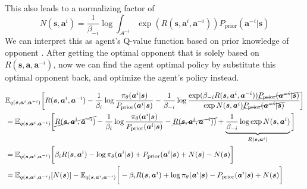 This also leads to a normalizing factor of 
\begin{equation}
    N(\boldsymbol{s}, \boldsymbol{a}^{i}) = \frac{1}{\beta_{-i} }\log \int_{\mathcal{A}^{-i}} \exp(R(\boldsymbol{s}, \boldsymbol{a}^i, \boldsymbol{a}^{-i}))P_{\text{prior}}(\boldsymbol{a}^{-i} | \boldsymbol{s})
\end{equation}
We can interpret this as agent's Q-value function based on prior knowledge of opponent \cite{grau2018balancing}. After getting the optimal opponent that is solely based on $R(\boldsymbol{s}, \boldsymbol{a}, \boldsymbol{a}^{-i})$, now we can find the agent optimal policy by substitute this optimal opponent back, and optimize the agent's policy instead.

\begin{equation*}
    \begin{aligned}
        &\mathbb{E}_{q(\boldsymbol{s}, \boldsymbol{a}^i, \boldsymbol{a}^{-i})}\bigg[ R(\boldsymbol{s}, \boldsymbol{a}^i, \boldsymbol{a}^{-i})  - \frac{1}{\beta_{i}}\log \frac{\pi_{\theta}(\boldsymbol{a}^i | \boldsymbol{s})}{P_{\text{prior}}(\boldsymbol{a}^i | \boldsymbol{s})}  - \frac{1}{\beta_{-i}}\log \frac{\exp(\beta_{-i} R(\boldsymbol{s}, \boldsymbol{a}^i, \boldsymbol{a}^{-i}))\cancel{P_{\text{prior}}(\boldsymbol{a}^{-i} | \boldsymbol{s})}}{\exp  N(\boldsymbol{s}, \boldsymbol{a}^{i}) \cancel{P_{\text{prior}}(\boldsymbol{a}^{-i} | \boldsymbol{s})} } \bigg] \\
        &= \mathbb{E}_{q(\boldsymbol{s}, \boldsymbol{a}^i, \boldsymbol{a}^{-i})}\bigg[ \cancel{R(\boldsymbol{s}, \boldsymbol{a}^i, \boldsymbol{a}^{-i})}  - \frac{1}{\beta_{i}}\log \frac{\pi_{\theta}(\boldsymbol{a}^i | \boldsymbol{s})}{P_{\text{prior}}(\boldsymbol{a}^i | \boldsymbol{s})}  - \cancel{R(\boldsymbol{s}, \boldsymbol{a}^i, \boldsymbol{a}^{-i}))} + \underbrace{ \frac{1}{\beta_{-i}}\log \exp N(\boldsymbol{s}, \boldsymbol{a}^{i})}_{R(\boldsymbol{s}, \boldsymbol{a}^i)} \bigg]\\
        &= \mathbb{E}_{q(\boldsymbol{s}, \boldsymbol{a}^i, \boldsymbol{a}^{-i})}\bigg[ \beta_i R(\boldsymbol{s}, \boldsymbol{a}^i) - \log \pi_{\theta}(\boldsymbol{a}^i | \boldsymbol{s}) +  P_{\text{prior}}(\boldsymbol{a}^i | \boldsymbol{s}) + N(\boldsymbol{s}) - N(\boldsymbol{s}) \bigg] \\
        &= \mathbb{E}_{q(\boldsymbol{s}, \boldsymbol{a}^i, \boldsymbol{a}^{-i})}[N(\boldsymbol{s})] - 
        \mathbb{E}_{q(\boldsymbol{s}, \boldsymbol{a}^i, \boldsymbol{a}^{-i})}\bigg[ -\beta_i R(\boldsymbol{s}, \boldsymbol{a}^i) + \log \pi_{\theta}(\boldsymbol{a}^i | \boldsymbol{s}) -  P_{\text{prior}}(\boldsymbol{a}^i | \boldsymbol{s}) + N(\boldsymbol{s}) \bigg] \\

\end{aligned}
\end{equation*}
